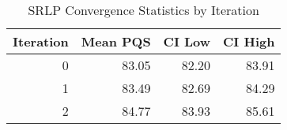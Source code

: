 \begin{table}[htbp]
\centering
\caption{SRLP Convergence Statistics by Iteration}
\label{tab:convergence}
\begin{tabular}{rrrr}
\toprule
Iteration & Mean PQS & CI Low & CI High \\
\midrule
0 & 83.05 & 82.20 & 83.91 \\
1 & 83.49 & 82.69 & 84.29 \\
2 & 84.77 & 83.93 & 85.61 \\
\bottomrule
\end{tabular}
\end{table}